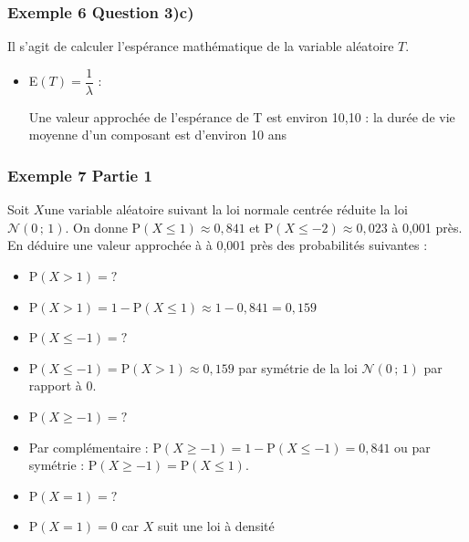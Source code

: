 \documentclass[xcolor=svgnames,t,final]{beamer}
\begin{document}
\begin{frame}


\frametitle{Exemple 6 Question 3)c)}

Il s'agit de calculer l'espérance mathématique de la variable aléatoire $T$.


\begin{itemize}

	\pause		\item	
E$(T)=\dfrac{1}{\lambda}$ :


Une valeur approchée de l'espérance de T est environ 10,10 :	
la durée de vie moyenne d'un composant est d'environ 10 ans


\end{itemize}


\end{frame}



\begin{frame}
\frametitle{Exemple 7 Partie 1}
\label{exemple7}

Soit  $X $une variable aléatoire suivant la loi normale centrée réduite la loi $\mathcal{N}\left(0 \, ; \, 1\right)$. On donne $\text{P}\left( X \leqslant 1 \right) \approx 0,841$  et  $\text{P}\left( X \leqslant -2 \right) \approx 0,023$ à 0,001 près. En déduire une valeur approchée à à 0,001 près des probabilités suivantes :

\begin{itemize}
\item $\text{P}\left( X > 1 \right) = ?$
\pause \item $\text{P}\left( X > 1 \right) = 1 -\text{P}\left( X \leqslant 1 \right)\approx 1 - 0,841 = 0,159$
\item $\text{P}\left( X \leqslant -1 \right)=?$
\pause \item $\text{P}\left( X \leqslant -1 \right)=\text{P}\left( X > 1 \right)\approx 0,159$ par symétrie de la loi $\mathcal{N}\left(0 \, ; \, 1\right)$ par rapport à 0. 
\item $\text{P}\left( X \geqslant -1 \right)=?$
\pause \item Par complémentaire :  $\text{P}\left( X \geqslant -1 \right)=1-\text{P}\left( X \leqslant -1 \right)=0,841$ ou par symétrie : $\text{P}\left( X \geqslant -1 \right)=\text{P}\left( X \leqslant 1 \right)$.
\item $\text{P}\left( X = 1 \right)=?$
\pause \item  $\text{P}\left( X = 1 \right)=0$ car $X$ suit une loi à densité

\end{itemize}


\end{frame}
\end{document}
